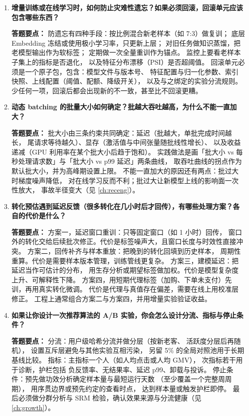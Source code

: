 \begin{interview}[题库与答题要点]
\begin{enumerate}[label=]
  \item[\textcolor{VioletDeep}{\textbf{Q31.}}] \textbf{增量训练或在线学习时，如何防止灾难性遗忘？如果必须回滚，回滚单元应该包含哪些东西？}
\par\smallskip\noindent\textcolor{VioletDeep}{\textbf{答题要点：}}
防遗忘有四种手段：按比例混合新老样本（如 7:3）做复训；
底层 Embedding 冻结或使用极小学习率，只更新上层；
对旧任务做知识蒸馏，把老模型输出作为软标签；
定期做一次全量重训作为锚点。
监控上要看老样本子集上的指标是否退化，
以及特征分布漂移（PSI）是否超阈值。
回滚单元必须是一个原子包，包含：模型文件与版本号、
特征配置与归一化参数、索引快照、上线配置（阈值、配额、降级开关），
以及与之绑定的实验分流规则。
少任何一项，回滚后都会出现新的不一致，甚至比不回滚更糟。

  \item[\textcolor{VioletDeep}{\textbf{Q32.}}] \textbf{动态 batching 的批量大小如何确定？批越大吞吐越高，为什么不能一直加大？}
\par\smallskip\noindent\textcolor{VioletDeep}{\textbf{答题要点：}}
批大小由三条约束共同确定：延迟（批越大，单批完成时间越长，
尾请求等待越久）、显存（激活值与中间张量随批线性增长）、
以及收益递减（GPU 利用率在某个批大小后趋于饱和）。
实践做法是画「批大小 vs 每秒处理请求数」与「批大小 vs p99 延迟」两条曲线，
取吞吐曲线的拐点作为默认批大小，并为高峰期设置上限。
不能一直加大的原因还有两点：批过大时梯度噪声降低，
对在线学习反而不利；批过大让新模型上线的影响面一次性放大，
事故半径变大（见 \cref{ch:receng}）。

  \item[\textcolor{VioletDeep}{\textbf{Q33.}}] \textbf{转化预估遇到延迟反馈（很多转化在几小时后才回传），有哪些处理方案？各自的代价是什么？}
\par\smallskip\noindent\textcolor{VioletDeep}{\textbf{答题要点：}}
方案一，延迟窗口重训：只等固定窗口（如 1 小时）回传，
窗口外的转化交给后续批次修正。代价是标签噪声大，且窗口长度与时效性直接冲突。
方案二，回传补齐与样本重放：把晚到的转化回填到历史样本，
周期性重算。代价是需要样本版本管理，训练管线更复杂。
方案三，建模延迟：把延迟当作可估计的分布，
用生存分析或期望标签做加权。代价是模型复杂度上升、可解释性下降。
方案四，用短期代理标签（加购、下单未支付）先训，再用真实转化微调。
代价是代理与真值存在偏差，需要在线上用校准层修正。
工程上通常组合方案二与方案四，并用增量实验验证收益。

  \item[\textcolor{VioletDeep}{\textbf{Q34.}}] \textbf{如果让你设计一次推荐算法的 A/B 实验，你会怎么设计分流、指标与停止条件？}
\par\smallskip\noindent\textcolor{VioletDeep}{\textbf{答题要点：}}
分流：用户级哈希分流并做分层（按新老客、
活跃度分层后再随机），
设置互斥层避免与其他实验互相污染，
另留 5\% 的全局对照池用于长期基线比较。
指标：主指标一个人（如人均点击或人均 GMV），
次指标若干用于诊断，护栏包括
负反馈率、无结果率、延迟 p99、卸载与投诉。
停止条件：预先做功效分析确定样本量与最短运行天数
（至少覆盖一个完整周周期），
用序贯边界或预先约定的查看时点，
达到样本量或触发护栏即停。
最后必须做分群分析与 SRM 检验，确认效果来源与分流健康（见 \cref{ch:growth}）。


\end{enumerate}
\end{interview}
